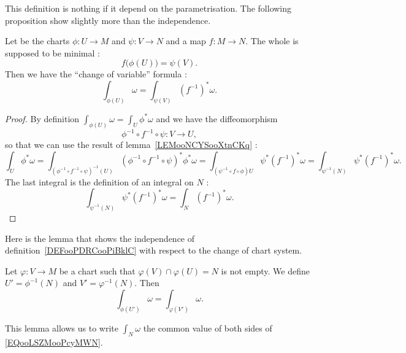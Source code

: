 This definition is nothing if it depend on the parametrisation. The following proposition show slightly more than the independence.
\begin{proposition}       \label{PROPooNJCLooMqeeeX}
	Let be the charts \( \phi\colon U\to M\) and \( \psi\colon V\to N\) and a map \( f\colon M\to N\). The whole is supposed to be minimal :
	\begin{equation}
		f\big( \phi(U) \big)=\psi(V).
	\end{equation}
	Then we have the ``change of variable'' formula :
	\begin{equation}
		\int_{\phi(U)}\omega=\int_{\psi(V)}(f^{-1})^*\omega.
	\end{equation}
\end{proposition}

\begin{proof}
	By definition \( \int_{\phi(U)}\omega=\int_U\phi^*\omega\) and we have the diffeomorphism
	\begin{equation}
		\phi^{-1}\circ f^{-1}\circ \psi\colon V\to U,
	\end{equation}
	so that we can use the result of lemma~\ref{LEMooNCYSooXtnCKq} :
	\begin{equation}
		\int_U\phi^*\omega=\int_{(\phi^{-1}\circ f^{-1}\circ \psi)^{-1}(U)}  (\phi^{-1}\circ f^{-1}\circ \psi)^*\phi^*\omega=\int_{(\psi^{-1}\circ f\circ \phi )U}\psi^*(f^{-1})^*\omega=\int_{\psi^{-1}(N)}\psi^*(f^{-1})^*\omega.
	\end{equation}
	The last integral is the definition of an integral on \( N\) :
	\begin{equation}
		\int_{\psi^{-1}(N)}\psi^*(f^{-1})^*\omega=\int_N(f^{-1})^*\omega.
	\end{equation}
\end{proof}

Here is the lemma that shows the independence of definition~\ref{DEFooPDRCooPiBklC} with respect to the change of chart system.
\begin{lemma}
	Let \( \varphi\colon V\to M\) be a chart such that \( \varphi(V)\cap \varphi(U)=N\) is not empty. We define \( U'=\phi^{-1}(N)\) and \( V'=\varphi^{-1}(N)\). Then
	\begin{equation}        \label{EQooLSZMooPcyMWN}
		\int_{\phi(U')}\omega=\int_{\varphi(V')}\omega.
	\end{equation}
\end{lemma}
This lemma allows us to write \( \int_N\omega\) the common value of both sides of \eqref{EQooLSZMooPcyMWN}.

